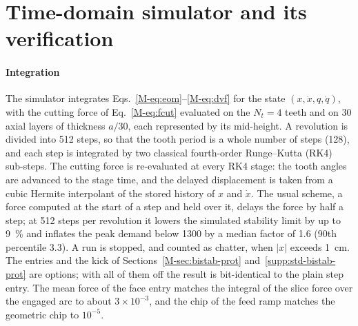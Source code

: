 \section{Time-domain simulator and its verification}\label{app:simulator}

\paragraph{Integration}
The simulator integrates Eqs.~\eqref{M-eq:eom}--\eqref{M-eq:dvf} for the state $(x,\dot x,q,\dot q)$, with the cutting force of Eq.~\eqref{M-eq:fcut} evaluated on the $N_t=4$ teeth and on 30 axial layers of thickness $a/30$, each represented by its mid-height. A revolution is divided into 512 steps, so that the tooth period is a whole number of steps (128), and each step is integrated by two classical fourth-order Runge--Kutta (RK4) sub-steps. The cutting force is re-evaluated at every RK4 stage: the tooth angles are advanced to the stage time, and the delayed displacement is taken from a cubic Hermite interpolant of the stored history of $x$ and $\dot x$. The usual scheme, a force computed at the start of a step and held over it, delays the force by half a step; at 512 steps per revolution it lowers the simulated stability limit by up to \SI{9}{\percent} and inflates the peak demand below \SI{1300}{\rpm} by a median factor of 1.6 (90th percentile 3.3). A run is stopped, and counted as chatter, when $\lvert x\rvert$ exceeds \SI{1}{\centi\metre}. The entries and the kick of Sections~\ref{M-sec:bistab-prot} and~\ref{supp:std-bistab-prot} are options; with all of them off the result is bit-identical to the plain step entry. The mean force of the face entry matches the integral of the slice force over the engaged arc to about $3\times10^{-3}$, and the chip of the feed ramp matches the geometric chip to $10^{-5}$.

